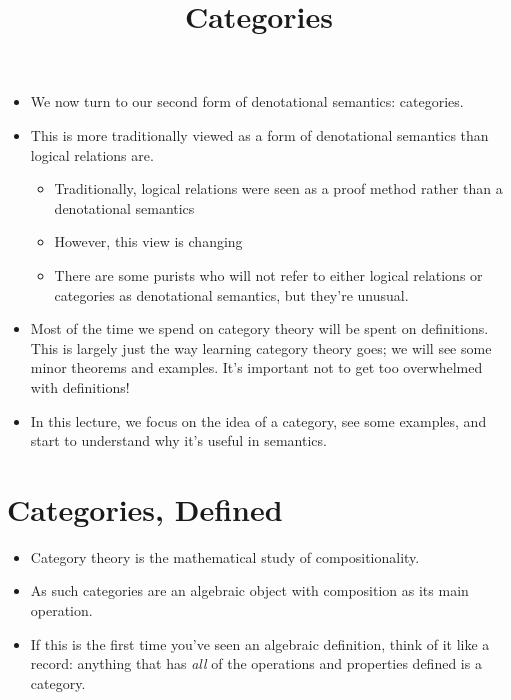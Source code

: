 \documentclass{lecturenotes}
\title{Categories}
\begin{document}
\maketitle

\begin{itemize}
\item We now turn to our second form of denotational semantics: categories.
\item This is more traditionally viewed as a form of denotational semantics than logical relations are.
  \begin{itemize}
  \item Traditionally, logical relations were seen as a proof method rather than a denotational semantics
  \item However, this view is changing
  \item There are some purists who will not refer to either logical relations or categories as denotational semantics, but they're unusual.
  \end{itemize}
\item Most of the time we spend on category theory will be spent on definitions.
  This is largely just the way learning category theory goes; we will see some minor theorems and examples.
  It's important not to get too overwhelmed with definitions!
\item In this lecture, we focus on the idea of a category, see some examples, and start to understand why it's useful in semantics.
\end{itemize}

\section{Categories, Defined}
\label{sec:categories-defined}

\begin{itemize}
\item Category theory is the mathematical study of compositionality.
\item As such categories are an algebraic object with composition as its main operation.
\item If this is the first time you've seen an algebraic definition, think of it like a record: anything that has \emph{all} of the operations and properties defined is a category.
\end{itemize}
\end{document}
